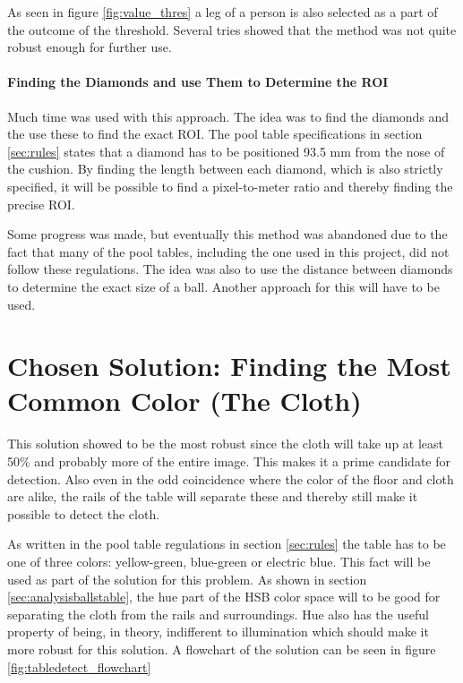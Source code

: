 As seen in figure \ref{fig:value_thres} a leg of a person is also selected as a part of the outcome of the threshold. Several tries showed that the method was not quite robust enough for further use.

\paragraph{Finding the Diamonds and use Them to Determine the ROI}
Much time was used with this approach. The idea was to find the diamonds and the use these to find the exact ROI. The pool table specifications in section \ref{sec:rules} states that a diamond has to be positioned 93.5 mm from the nose of the cushion. By finding the length between each diamond, which is also strictly specified, it will be possible to find a pixel-to-meter ratio and thereby finding the precise ROI.

Some progress was made, but eventually this method was abandoned due to the fact that many of the pool tables, including the one used in this  project, did not follow these regulations. The idea was also to use the distance between diamonds to determine the exact size of a ball. Another approach for this will have to be used.

\section{Chosen Solution: Finding the Most Common Color (The Cloth)}
This solution showed to be the most robust since the cloth will take up at least 50\% and probably more of the entire image. This makes it a prime candidate for detection. Also even in the odd coincidence where the color of the floor and cloth are alike, the rails of the table will separate these and thereby still make it possible to detect the cloth.

As written in the pool table regulations in section \ref{sec:rules} the table has to be one of three colors: yellow-green, blue-green or electric blue. This fact will be used as part of the solution for this problem. As shown in section \ref{sec:analysisballstable}, the hue part of the HSB color space will to be good for separating the cloth from the rails and surroundings. Hue also has the useful property of being, in theory, indifferent to illumination which should make it more robust for this solution. A flowchart of the solution can be seen in figure \ref{fig:tabledetect_flowchart}


